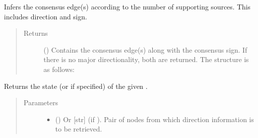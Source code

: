 \documentclass[letterpaper,10pt,english]{sphinxmanual}
\begin{document}
\begin{fulllineitems}
\begin{fulllineitems}
\begin{quote}
\begin{description}
\begin{description}
\end{description}


\end{description}\end{quote}

\end{fulllineitems}


\begin{fulllineitems}
\label{\detokenize{reference:pypath.main.Direction.consensus_edges}}
Infers the consensus edge(s) according to the number of
supporting sources. This includes direction and sign.
\begin{quote}\begin{description}
\item[{Returns}] \leavevmode
() \textendash{} Contains the consensus edge(s) along with the
consensus sign. If there is no major directionality, both
are returned. The structure is as follows:

\end{description}\end{quote}

\end{fulllineitems}


\begin{fulllineitems}
\label{\detokenize{reference:pypath.main.Direction.get_dir}}
Returns the state (or  if specified) of the given
.
\begin{quote}\begin{description}
\item[{Parameters}] \leavevmode\begin{itemize}
\item {} 
 () \textendash{} Or {[}str{]} (if ). Pair of nodes from which
direction information is to be retrieved.


\end{itemize}
\end{description}
\end{quote}
\end{fulllineitems}
\end{fulllineitems}
\end{document}
